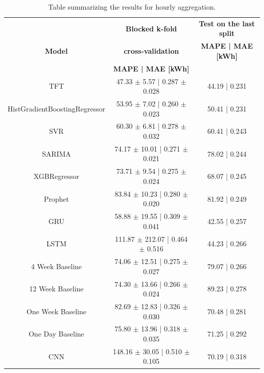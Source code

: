 \begin{table}[H]
\centering
\begin{tabular}{|c|c|c|}
\hline
 & \textbf{Blocked k-fold} & \textbf{Test on the last split}\\
\textbf{Model} & \textbf{cross-validation} & \textbf{MAPE | MAE [kWh]}\\
 & \textbf{MAPE | MAE [kWh]} & \\
\hline
TFT & 47.33 $\pm$ 5.57 | 0.287 $\pm$ 0.028 & 44.19 | 0.231\\
\hline
HistGradientBoostingRegressor & 53.95 $\pm$ 7.02 | 0.260 $\pm$ 0.023 & 50.41 | 0.231\\
\hline
SVR & 60.30 $\pm$ 6.81 | 0.278 $\pm$ 0.032 & 60.41 | 0.243\\
\hline
SARIMA & 74.17 $\pm$ 10.01 | 0.271 $\pm$ 0.021 & 78.02 | 0.244\\
\hline
XGBRegressor & 73.71 $\pm$ 9.54 | 0.275 $\pm$ 0.024 & 68.07 | 0.245\\
\hline
Prophet & 83.84 $\pm$ 10.23 | 0.280 $\pm$ 0.020 & 81.92 | 0.249\\
\hline
GRU & 58.88 $\pm$ 19.55 | 0.309 $\pm$ 0.041 & 42.55 | 0.257\\
\hline
LSTM & 111.87 $\pm$ 212.07 | 0.464 $\pm$ 0.516 & 44.23 | 0.266\\
\hline
4 Week Baseline & 74.06 $\pm$ 12.51 | 0.275 $\pm$ 0.027 & 79.07 | 0.266\\
\hline
12 Week Baseline & 74.30 $\pm$ 13.66 | 0.266 $\pm$ 0.024 & 89.23 | 0.278\\
\hline
One Week Baseline & 82.69 $\pm$ 12.83 | 0.326 $\pm$ 0.030 & 70.48 | 0.281\\
\hline
One Day Baseline & 75.80 $\pm$ 13.96 | 0.318 $\pm$ 0.035 & 71.25 | 0.292\\
\hline
CNN & 148.16 $\pm$ 30.05 | 0.510 $\pm$ 0.105 & 70.19 | 0.318\\
\hline
\end{tabular}
\caption{Table summarizing the results for hourly aggregation.}
\label{tab:baselinehourlyresults}
\end{table}

